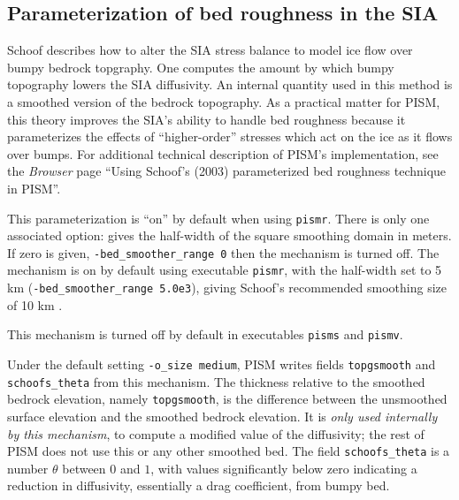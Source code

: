 \subsection{Parameterization of bed roughness in the SIA} \label{subsect:bedsmooth} 

Schoof \cite{Schoofbasaltopg2003} describes how to alter the SIA stress balance to model ice flow over bumpy bedrock topgraphy.  One computes the amount by which bumpy topography lowers the SIA diffusivity.  An internal quantity used in this method is a smoothed version of the bedrock topography.  As a practical matter for PISM, this theory improves the SIA's ability to handle bed roughness because it parameterizes the effects of ``higher-order'' stresses which act on the ice as it flows over bumps.  For additional technical description of PISM's implementation, see the \emph{Browser} page ``Using Schoof's (2003) parameterized bed roughness technique in PISM''.

This parameterization is ``on'' by default when using \texttt{pismr}.  There is only one associated option:  gives the half-width of the square smoothing domain in meters.  If zero is given, \texttt{-bed_smoother_range 0} then the mechanism is turned off.  The mechanism is on by default using executable \texttt{pismr}, with the half-width set to 5 km (\texttt{-bed_smoother_range 5.0e3}), giving Schoof's recommended smoothing size of 10 km \cite{Schoofbasaltopg2003}.

This mechanism is turned off by default in executables \texttt{pisms} and \texttt{pismv}.

Under the default setting \texttt{-o_size medium}, PISM writes fields \texttt{topgsmooth} and \texttt{schoofs_theta} from this mechanism.  The thickness relative to the smoothed bedrock elevation, namely \texttt{topgsmooth}, is the difference between the unsmoothed surface elevation and the smoothed bedrock elevation.  It is \emph{only used internally by this mechanism}, to compute a modified value of the diffusivity; the rest of PISM does not use this or any other smoothed bed.  The field \texttt{schoofs_theta} is a number $\theta$ between $0$ and $1$, with values significantly below zero indicating a reduction in diffusivity, essentially a drag coefficient, from bumpy bed.



